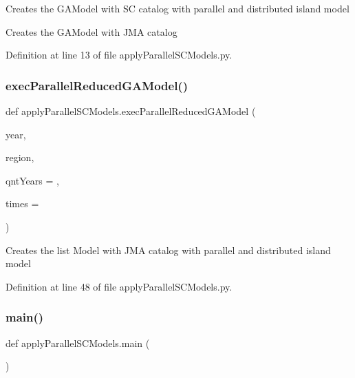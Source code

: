 \begin{DoxyVerb}Creates the GAModel with SC catalog with parallel and distributed island model
\end{DoxyVerb}
\begin{DoxyVerb}    Creates the GAModel with JMA catalog\end{DoxyVerb}
 

Definition at line 13 of file apply\+Parallel\+S\+C\+Models.\+py.

\mbox{\label{namespaceapply_parallel_s_c_models_a3a10fdef3927dc7dfb2abe7b2e828dcb}} 
\subsubsection{\texorpdfstring{exec\+Parallel\+Reduced\+G\+A\+Model()}{execParallelReducedGAModel()}}
{\footnotesize\ttfamily def apply\+Parallel\+S\+C\+Models.\+exec\+Parallel\+Reduced\+G\+A\+Model (\begin{DoxyParamCaption}\item[{}]{year,  }\item[{}]{region,  }\item[{}]{qnt\+Years = {},  }\item[{}]{times = {} }\end{DoxyParamCaption})}

\begin{DoxyVerb}Creates the list Model with JMA catalog with parallel and distributed island model
\end{DoxyVerb}
 

Definition at line 48 of file apply\+Parallel\+S\+C\+Models.\+py.

\mbox{\label{namespaceapply_parallel_s_c_models_a6b92e21fbbbe7d88257c677e030865f7}} 
\subsubsection{\texorpdfstring{main()}{main()}}
{\footnotesize\ttfamily def apply\+Parallel\+S\+C\+Models.\+main (\begin{DoxyParamCaption}{ }\end{DoxyParamCaption})}

